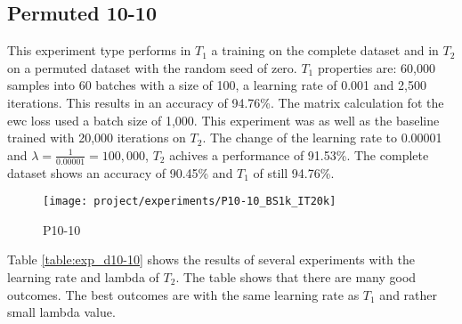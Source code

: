 \newpage

\subsection{Permuted 10-10}

This experiment type performs in $T_1$ a training on the complete dataset and in $T_2$ on a permuted dataset with the random seed of zero.
\newline
$T_1$ properties are: 60,000 samples into 60 batches with a size of 100, a learning rate of 0.001 and 2,500 iterations.
This results in an accuracy of 94.76\%.
The matrix calculation fot the \acrshort{ewc} loss used a batch size of 1,000.
\newline
This experiment was as well as the baseline trained with 20,000 iterations on $T_2$.
The change of the learning rate to 0.00001 and $\lambda = \frac{1}{0.00001} = 100,000$, $T_2$ achives a performance of 91.53\%.
The complete dataset shows an accuracy of 90.45\% and $T_1$ of still 94.76\%.

\begin{figure}[H]
    \centering
    \texttt{[image: project/experiments/P10-10\_BS1k\_IT20k]}
    \caption{P10-10}
    \label{fig:exp_p10-10}
\end{figure}

\newpage

Table \ref{table:exp_d10-10} shows the results of several experiments with the learning rate and lambda of $T_2$.
The table shows that there are many good outcomes.
The best outcomes are with the same learning rate as $T_1$ and rather small lambda value.

